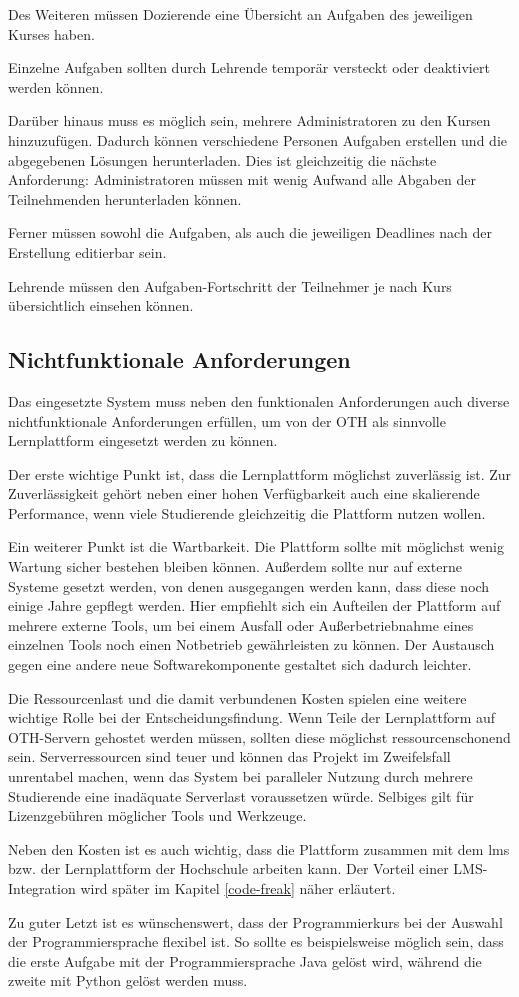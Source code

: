 Des Weiteren müssen Dozierende eine Übersicht an Aufgaben des jeweiligen Kurses
haben.

Einzelne Aufgaben sollten durch Lehrende temporär versteckt oder deaktiviert
werden können.

Darüber hinaus muss es möglich sein, mehrere Administratoren zu den Kursen
hinzuzufügen. Dadurch können verschiedene Personen Aufgaben erstellen und die
abgegebenen Lösungen herunterladen. Dies ist gleichzeitig die nächste
Anforderung: Administratoren müssen mit wenig Aufwand alle Abgaben der
Teilnehmenden herunterladen können.

Ferner müssen sowohl die Aufgaben, als auch die jeweiligen Deadlines nach der
Erstellung editierbar sein.

Lehrende müssen den Aufgaben-Fortschritt der Teilnehmer je nach Kurs 
übersichtlich einsehen können.

\subsection{Nichtfunktionale Anforderungen}
\label{anforderungsanalyse-nichtfunktional}
Das eingesetzte System muss neben den funktionalen Anforderungen auch diverse
nichtfunktionale Anforderungen erfüllen, um von der OTH als sinnvolle
Lernplattform eingesetzt werden zu können.

Der erste wichtige Punkt ist, dass die Lernplattform möglichst zuverlässig ist.
Zur Zuverlässigkeit gehört neben einer hohen Verfügbarkeit auch eine skalierende
Performance, wenn viele Studierende gleichzeitig die Plattform nutzen wollen.

Ein weiterer Punkt ist die Wartbarkeit. Die Plattform sollte mit möglichst wenig
Wartung sicher bestehen bleiben können. Außerdem sollte nur auf externe Systeme
gesetzt werden, von denen ausgegangen werden kann, dass diese noch einige Jahre
gepflegt werden. Hier empfiehlt sich ein Aufteilen der Plattform auf mehrere
externe Tools, um bei einem Ausfall oder Außerbetriebnahme eines einzelnen Tools
noch einen Notbetrieb gewährleisten zu können. Der Austausch gegen eine andere
neue Softwarekomponente gestaltet sich dadurch leichter.

Die Ressourcenlast und die damit verbundenen Kosten spielen eine weitere
wichtige Rolle bei der Entscheidungsfindung. Wenn Teile der Lernplattform auf
OTH-Servern gehostet werden müssen, sollten diese möglichst ressourcenschonend
sein. Serverressourcen sind teuer und können das Projekt im Zweifelsfall
unrentabel machen, wenn das System bei paralleler Nutzung durch mehrere
Studierende eine inadäquate Serverlast voraussetzen würde. Selbiges gilt für
Lizenzgebühren möglicher Tools und Werkzeuge.

Neben den Kosten ist es auch wichtig, dass die Plattform zusammen mit dem
\ac{lms} bzw. der Lernplattform der Hochschule arbeiten kann. Der Vorteil einer
LMS-Integration wird später im Kapitel \ref{code-freak} näher erläutert.

Zu guter Letzt ist es wünschenswert, dass der Programmierkurs bei der Auswahl
der Programmiersprache flexibel ist. So sollte es beispielsweise möglich sein,
dass die erste Aufgabe mit der Programmiersprache Java gelöst wird,
während die zweite mit Python gelöst werden muss.